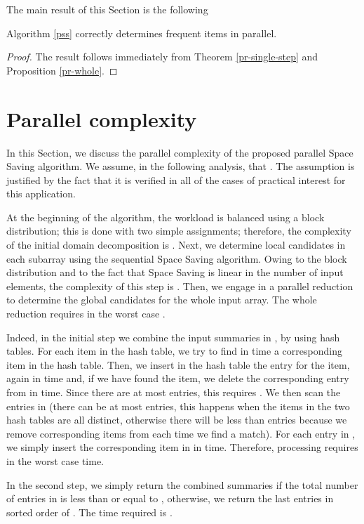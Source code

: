 \documentclass[final,3p,times]{elsarticle}
\begin{document}
The main result of this Section is the following 

\begin{thm} Algorithm \ref{pss} correctly determines frequent items in parallel.
\end{thm}

\begin{proof}
The result follows immediately from Theorem \ref{pr-single-step} and Proposition \ref{pr-whole}.
\end{proof}


\section{Parallel complexity}
\label{pss-analysis}
In this Section, we discuss the parallel complexity of the proposed parallel Space Saving algorithm. We assume, in the following analysis, that . The assumption is justified by the fact that it is verified in all of the cases of practical interest for this application.

At the beginning of the algorithm, the workload is balanced using a block
distribution; this is done with two simple  assignments; therefore, the complexity of the initial domain decomposition is . Next,
we determine local candidates in each subarray using the sequential Space Saving algorithm. Owing to the block distribution and to the fact that Space Saving is linear in the
number of input elements, the complexity of this step is . Then, we engage in a parallel reduction to
determine the global candidates for the whole input array. The whole reduction requires in the worst case .

Indeed, in the initial step we combine the input summaries in , by using hash tables. For each item in the  hash table, we try to find in  time a corresponding item in the  hash table. Then, we insert in the  hash table the entry for the item, again in  time and, if we have found the item, we delete the corresponding entry from  in  time. Since there are at most  entries, this requires . We then scan the entries in   (there can be at most  entries, this happens when the items in the two hash tables are all distinct, otherwise there will be less than  entries because we remove corresponding items from  each time we find a match). For each entry in , we simply insert the corresponding item in  in  time. Therefore, processing  requires in the worst case  time.

In the second step, we simply return the combined summaries if the total number of entries in  is less than or equal to , otherwise, we return the last  entries in sorted order of . The time required is .
\end{document}
